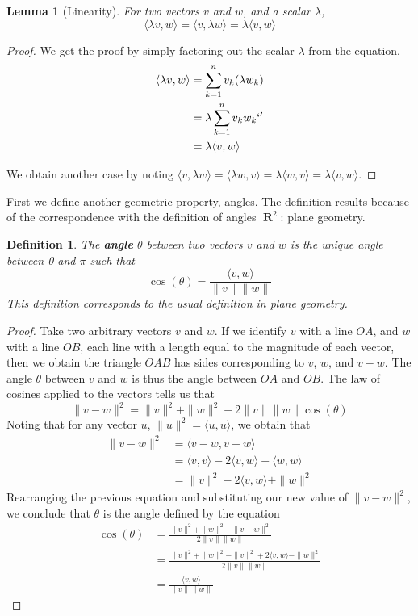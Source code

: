 \documentclass{report}
\newtheorem{lemma}[theorem]{Lemma}
\newtheorem{definition}{Definition}
\DeclareMathOperator{\real}{\mathbf{R}}
\begin{document}
\begin{lemma}[Linearity]
  For two vectors $v$ and $w$, and a scalar $\lambda$,
  \[ \langle \lambda v, w \rangle = \langle v, \lambda w \rangle = \lambda \langle v, w \rangle \]
\end{lemma}
\begin{proof}
  We get the proof by simply factoring out the scalar $\lambda$ from the equation.
  \begin{align*}
    \langle \lambda v, w \rangle &= \sum_{k = 1}^n v_k (\lambda w_k)\\
                                 &= \lambda \sum_{k = 1}^n v_k w_k`'\\
                                 &= \lambda \langle v, w \rangle
  \end{align*}

  We obtain another case by noting $\langle v, \lambda w \rangle = \langle \lambda w, v \rangle = \lambda \langle w, v \rangle = \lambda \langle v, w \rangle$.
\end{proof}

First we define another geometric property, angles. The definition results because of the correspondence with the definition of angles $\real^2$: plane geometry.

\begin{definition}
  The {\bf angle} $\theta$ between two vectors $v$ and $w$ is the unique angle between 0 and $\pi$ such that
  \[ \cos(\theta) = \frac{\langle v, w \rangle}{\| v \| \| w \|} \]
  This definition corresponds to the usual definition in plane geometry.
\end{definition}
\begin{proof}
  Take two arbitrary vectors $v$ and $w$. If we identify $v$ with a line $OA$, and $w$ with a line $OB$, each line with a length equal to the magnitude of each vector, then we obtain the triangle $OAB$ has sides corresponding to $v$, $w$, and $v-w$. The angle $\theta$ between $v$ and $w$ is thus the angle between $OA$ and $OB$. The law of cosines applied to the vectors tells us that
  \[ \| v - w \|^2 = \|v\|^2 + \|w\|^2 - 2\|v\|\|w\| \cos(\theta) \]
  Noting that for any vector $u$, $\|u\|^2 = \langle u, u \rangle$, we obtain that
  \begin{align*}
    \|v - w\|^2 &= \langle v - w, v - w \rangle\\
                &= \langle v, v \rangle - 2 \langle v, w \rangle + \langle w, w \rangle\\
                &= \|v\|^2 - 2 \langle v, w \rangle + \|w\|^2
  \end{align*}
  Rearranging the previous equation and substituting our new value of $\|v - w\|^2$, we conclude that $\theta$ is the angle defined by the equation
  \begin{align*}
    \cos(\theta) &= \frac{\|v\|^2 + \|w\|^2 - \|v - w\|^2}{2\|v\|\|w\|}\\
                 &= \frac{\|v\|^2 + \|w\|^2 - \|v\|^2 + 2\langle v, w \rangle - \|w\|^2}{2\|v\|\|w\|}\\
                 &= \frac{\langle v, w \rangle}{\|v\|\|w\|}
  \end{align*}
\end{proof}
\end{document}
